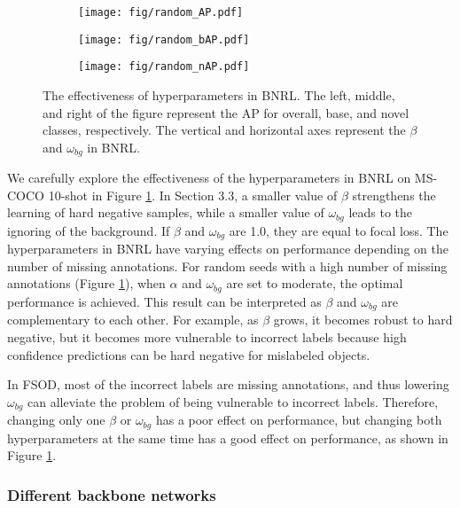 \documentclass{article}
\begin{document}
\begin{figure}[hbt!]
    \centering

    \begin{subfigure}[]{0.32\textwidth}
    \texttt{[image: fig/random\_AP.pdf]}
    \end{subfigure}
    \begin{subfigure}[]{0.32\textwidth}
    \texttt{[image: fig/random\_bAP.pdf]}
    \end{subfigure}
    \begin{subfigure}[]{0.32\textwidth}
    \texttt{[image: fig/random\_nAP.pdf]}
    \end{subfigure}

    \caption{The effectiveness of hyperparameters in BNRL. 
    The left, middle, and right of the figure represent the AP for overall, base, and novel classes, respectively.
    The vertical and horizontal axes represent the $\beta$ and $\omega_{bg}$ in BNRL.
    }
    \label{fig:BNRL}
\end{figure}

We carefully explore the effectiveness of the hyperparameters in BNRL on MS-COCO 10-shot in Figure \ref{fig:BNRL}. 
In Section 3.3, a smaller value of $\beta$ strengthens the learning of hard negative samples, while a smaller value of $\omega_{bg}$ leads to the ignoring of the background.
If $\beta$ and $\omega_{bg}$ are 1.0, they are equal to focal loss.
The hyperparameters in BNRL have varying effects on performance depending on the number of missing annotations. 
For random seeds with a high number of missing annotations (Figure \ref{fig:BNRL}), when $\alpha$ and $\omega_{bg}$ are set to moderate, the optimal performance is achieved.
This result can be interpreted as $\beta$ and $\omega_{bg}$ are complementary to each other.
For example, as $\beta$ grows, it becomes robust to hard negative, but it becomes more vulnerable to incorrect labels because high confidence predictions can be hard negative for mislabeled objects.  

In FSOD, most of the incorrect labels are missing annotations, and thus lowering $\omega_{bg}$ can alleviate the problem of being vulnerable to incorrect labels.
Therefore, changing only one $\beta$ or $\omega_{bg}$ has a poor effect on performance, but changing both hyperparameters at the same time has a good effect on performance, as shown in Figure \ref{fig:BNRL}.


\subsubsection{Different backbone networks}
\end{document}
